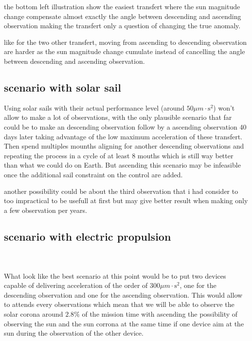 \documentclass[11pt]{article} %
\begin{document}
			the bottom left illustration show the easiest transfert where the sun magnitude change compensate almost exactly the angle between descending and ascending observation making the transfert only a question of changing the true anomaly.
			
			like for the two other transfert, moving from ascending to descending observation are harder as the sun magnitude change cumulate instead of cancelling the angle between descending and ascending observation. 
			
			
			
			\subsection{scenario with solar sail}
			
			Using solar sails with their actual performance level (around $50\mu{m}\cdot\text{s}^2$) won't allow to make a lot of observations, with the only plausible scenario that far could be to make an descending observation follow by a ascending observation 40 days later taking advantage of the low maximum acceleration of these transfert. Then spend multiples mounths aligning for another descending observations and repeating the process in a cycle of at least 8 mouths which is still way better than what we could do on Earth. But ascending this scenario may be infeasible once the additional sail constraint on the control are added.
			
			another possibility could be about the third observation that i had consider to too impractical to be usefull at first but may give better result when making only a few observation per years.
			
			\subsection{scenario with electric propulsion}	
			\\ \\
			What look like the best scenario at this point would be to put two devices capable of delivering acceleration of the order of $300\mu{m}\cdot\text{s}^2$, one for the descending observation and one for the ascending observation. This would allow to attends every observations which mean that we will be able to observe the solar corona around $2.8\%$ of the mission time with ascending the possibility of observing the sun and the sun corrona at the same time if one device aim at the sun during the observation of the other device.
			
\end{document}
